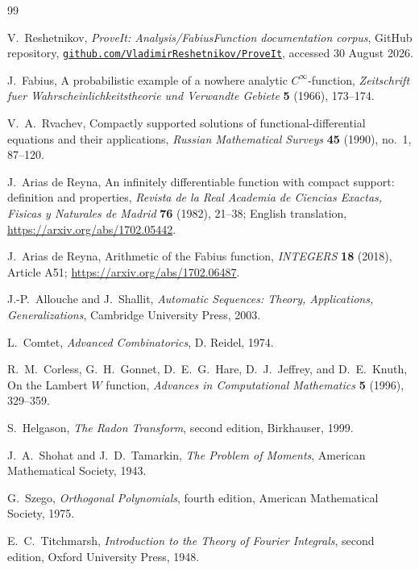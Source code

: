 \documentclass[11pt]{article}
\numberwithin{equation}{section}
\theoremstyle{definition}
\theoremstyle{remark}
\begin{document}
\begingroup
\sloppy
\begin{thebibliography}{99}

V.~Reshetnikov,
\emph{ProveIt: Analysis/FabiusFunction documentation corpus},
GitHub repository,
\href{https://github.com/VladimirReshetnikov/ProveIt/tree/main/Analysis/FabiusFunction/docs}%
{\nolinkurl{github.com/VladimirReshetnikov/ProveIt}},
accessed 30 August 2026.

J.~Fabius,
A probabilistic example of a nowhere analytic $C^\infty$-function,
\emph{Zeitschrift fuer Wahrscheinlichkeitstheorie und Verwandte Gebiete}
\textbf{5} (1966), 173--174.

V.~A.~Rvachev,
Compactly supported solutions of functional-differential equations and their
applications,
\emph{Russian Mathematical Surveys} \textbf{45} (1990), no.~1, 87--120.

J.~Arias de Reyna,
An infinitely differentiable function with compact support: definition and
properties,
\emph{Revista de la Real Academia de Ciencias Exactas, Fisicas y Naturales de
Madrid} \textbf{76} (1982), 21--38; English translation,
\url{https://arxiv.org/abs/1702.05442}.

J.~Arias de Reyna,
Arithmetic of the Fabius function,
\emph{INTEGERS} \textbf{18} (2018), Article A51;
\url{https://arxiv.org/abs/1702.06487}.

J.-P.~Allouche and J.~Shallit,
\emph{Automatic Sequences: Theory, Applications, Generalizations},
Cambridge University Press, 2003.

L.~Comtet,
\emph{Advanced Combinatorics},
D. Reidel, 1974.

R.~M.~Corless, G.~H.~Gonnet, D.~E.~G.~Hare, D.~J.~Jeffrey, and D.~E.~Knuth,
On the Lambert $W$ function,
\emph{Advances in Computational Mathematics} \textbf{5} (1996), 329--359.

S.~Helgason,
\emph{The Radon Transform}, second edition,
Birkhauser, 1999.

J.~A.~Shohat and J.~D.~Tamarkin,
\emph{The Problem of Moments},
American Mathematical Society, 1943.

G.~Szego,
\emph{Orthogonal Polynomials}, fourth edition,
American Mathematical Society, 1975.

E.~C.~Titchmarsh,
\emph{Introduction to the Theory of Fourier Integrals}, second edition,
Oxford University Press, 1948.

\end{thebibliography}
\endgroup
\end{document}
